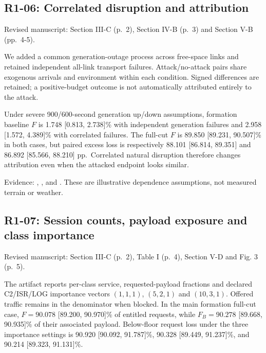 \subsection{R1-06: Correlated disruption and attribution}\label{r1-06-correlated-disruption-and-attribution}

Revised manuscript: Section III-C (p.~2), Section IV-B (p.~3) and Section V-B (pp.~4-5).

We added a common generation-outage process across free-space links and retained independent all-link transport failures. Attack/no-attack pairs share exogenous arrivals and environment within each condition. Signed differences are retained; a positive-budget outcome is not automatically attributed entirely to the attack.

Under severe 900/600-second generation up/down assumptions, formation baseline \(F\) is 1.748 {[}0.813, 2.738{]}\% with independent generation failures and 2.958 {[}1.572, 4.389{]}\% with correlated failures. The full-cut \(F\) is 89.850 {[}89.231, 90.507{]}\% in both cases, but paired excess loss is respectively 88.101 {[}86.814, 89.351{]} and 86.892 {[}85.566, 88.210{]} pp.~Correlated natural disruption therefore changes attribution even when the attacked endpoint looks similar.

Evidence: , , and . These are illustrative dependence assumptions, not measured terrain or weather.

\subsection{R1-07: Session counts, payload exposure and class importance}\label{r1-07-session-counts-payload-exposure-and-class-importance}

Revised manuscript: Section III-C (p.~2), Table I (p.~4), Section V-D and Fig. 3 (p.~5).

The artifact reports per-class service, requested-payload fractions and declared C2/ISR/LOG importance vectors \((1,1,1)\), \((5,2,1)\) and \((10,3,1)\). Offered traffic remains in the denominator when blocked. In the main formation full-cut case, \(F=90.078\) {[}89.200, 90.970{]}\% of entitled requests, while \(F_B=90.278\) {[}89.668, 90.935{]}\% of their associated payload. Below-floor request loss under the three importance settings is 90.920 {[}90.092, 91.787{]}\%, 90.328 {[}89.449, 91.237{]}\%, and 90.214 {[}89.323, 91.131{]}\%.

